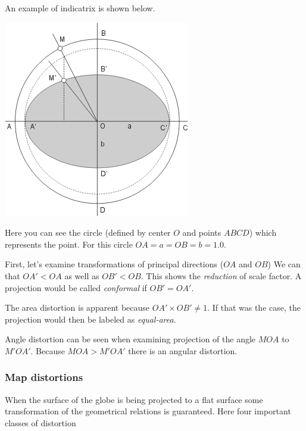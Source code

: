 \documentclass[letterpaper]{article}
\begin{document}
An example of indicatrix is shown below.

\begin{centering}
  \includegraphics[scale=0.5]{indicatrix.png}
\end{centering}

Here you can see the circle (defined by center $O$ and points $ABCD$)
which represents the point. For this circle $OA = a = OB = b = 1.0$.

First, let's examine transformations of principal directions ($OA$ and $OB$)
We can that $OA' < OA$ as well as $OB' < OB$.
This shows the \emph{reduction} of scale factor.
A projection would be called \emph{conformal} if $OB' = OA'$.

The area distortion is apparent because $OA' \times OB' \neq 1$. If that
was the case, the projection would then be labeled as \emph{equal-area}.

Angle distortion can be seen when examining projection of the angle $MOA$ to
$M'OA'$. Because $MOA > M'OA'$ there is an angular distortion.


\subsubsection{Map distortions}
\label{sec:map-distortions}

When the surface of the globe is being projected to a flat surface
some transformation of the geometrical relations is guaranteed.
Here four important classes of distortion
\end{document}
